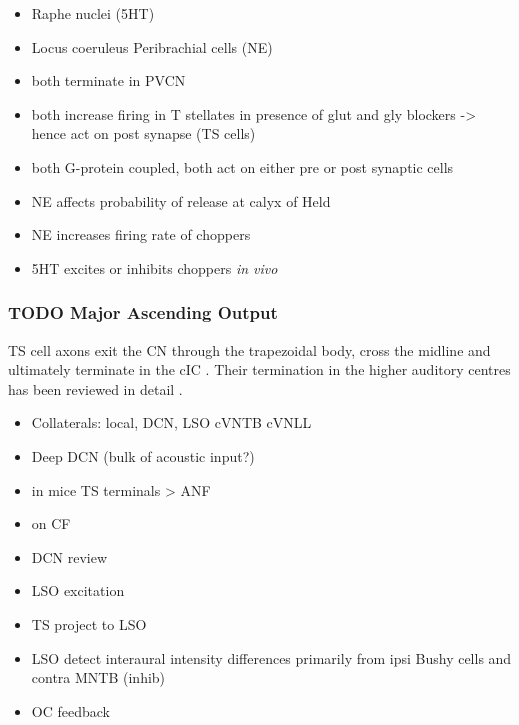 \begin{itemize}
\item Raphe nuclei (5HT)
\item Locus coeruleus Peribrachial cells (NE)
\item both terminate in PVCN \citep{KlepperHerbert:1991,Thompson:2003,ThompsonLauder:2005,Thompson:2003a,ThompsonWiechmann:2002,BehrensSchofieldEtAl:2002,ThompsonThompson:2001,ThompsonThompson:2001a,ThompsonMooreEtAl:1995,ThompsonThompsonEtAl:1994}
\item both increase firing in T stellates \citep{OertelWrightEtAl:2010} in presence of glut and gly blockers -> hence act on post synapse (TS cells)
\item both G-protein coupled, both act on either pre or post synaptic cells
\item NE affects probability of release at calyx of Held
\item NE increases firing rate of choppers \citep{KosslVater:1989,Ebert:1996}
\item 5HT excites or inhibits choppers \emph{in vivo} \citep{EbertOstwald:1992}
\end{itemize}




\subsubsection{TODO Major Ascending Output}
\label{sec-1_6}


TS cell axons exit the CN through the trapezoidal body, cross the midline and ultimately terminate in the cIC \citep{Adams:1979}. Their termination in the higher auditory centres has been reviewed in detail  \citep{DoucetRyugo:2006,CantBenson:2003}.

\begin{itemize}
\item Collaterals: local, DCN, LSO cVNTB cVNLL \citep{Warr:1969,SmithJorisEtAl:1993,Thompson:1998,DoucetRyugo:2003}
\item Deep DCN (bulk of acoustic input?)
\item in mice TS terminals > ANF \citep{CaoMcGinleyEtAl:2008}
\item on CF \citep{SmithRhode:1989,FriedlandPongstapornEtAl:2003,DoucetRyugo:1997}
\item DCN review \citep{OertelYoung:2004}
\item LSO excitation
\item TS project to LSO \citep{Thompson:1998,DoucetRyugo:2003,ThompsonThompson:1991a}
\item LSO detect interaural intensity differences primarily from ipsi Bushy cells and contra MNTB (inhib)
\item OC feedback
\end{itemize}

